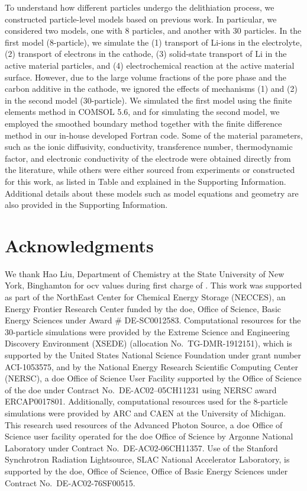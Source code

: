 \documentclass{article}
\begin{document}
To understand how different particles undergo the delithiation
process, we constructed particle-level models based on previous
work\cite{thornton2014-2}. In particular, we considered two models,
one with 8 particles, and another with 30 particles. In the first
model (8-particle), we simulate the (1) transport of Li-ions in the
electrolyte, (2) transport of electrons in the cathode, (3)
solid-state transport of Li in the active material particles, and (4)
electrochemical reaction at the active material surface. However, due
to the large volume fractions of the pore phase and the carbon
additive in the cathode, we ignored the effects of mechanisms (1) and
(2) in the second model (30-particle). We simulated the first model
using the finite elements method in COMSOL 5.6, and for simulating the
second model, we employed the smoothed boundary method
\cite{thornton2012} together with the finite difference method in our
in-house developed Fortran code. Some of the material parameters, such
as the ionic diffusivity, conductivity, transference number,
thermodynamic factor, and electronic conductivity of the \nca{}
electrode were obtained directly from the
literature\cite{lindbergh2008,lindbergh2008-2}, while others were
either sourced from experiments or constructed for this work, as
listed in Table  and explained in the
Supporting Information. Additional details about these models such as
model equations and geometry are also provided in the Supporting
Information.


\section*{Acknowledgments}

We thank Hao Liu, Department of Chemistry at the State University of
New York, Binghamton for \gls{ocv} values during first charge of
\nca{}. This work was supported as part of the NorthEast Center for
Chemical Energy Storage (NECCES), an Energy Frontier Research Center
funded by the \gls{doe}, Office of Science, Basic Energy Sciences
under Award \# DE-SC0012583. Computational resources for the
30-particle simulations were provided by the Extreme Science and
Engineering Discovery Environment (XSEDE) (allocation
No.\ TG-DMR-1912151)\cite{wilkins-diehr2014}, which is supported by
the United States National Science Foundation under grant number
ACI-1053575, and by the National Energy Research Scientific Computing
Center (NERSC), a \gls{doe} Office of Science User Facility supported
by the Office of Science of the \gls{doe} under Contract
No.\ DE-AC02–05CH11231 using NERSC award ERCAP0017801. Additionally,
computational resources used for the 8-particle simulations were
provided by ARC and CAEN at the University of Michigan.  This research
used resources of the Advanced Photon Source, a \gls{doe} Office of
Science user facility operated for the \gls{doe} Office of Science by
Argonne National Laboratory under Contract No.\ DE-AC02-06CH11357. Use
of the Stanford Synchrotron Radiation Lightsource, SLAC National
Accelerator Laboratory, is supported by the \gls{doe}, Office of
Science, Office of Basic Energy Sciences under Contract
No.\ DE-AC02-76SF00515.
\end{document}
